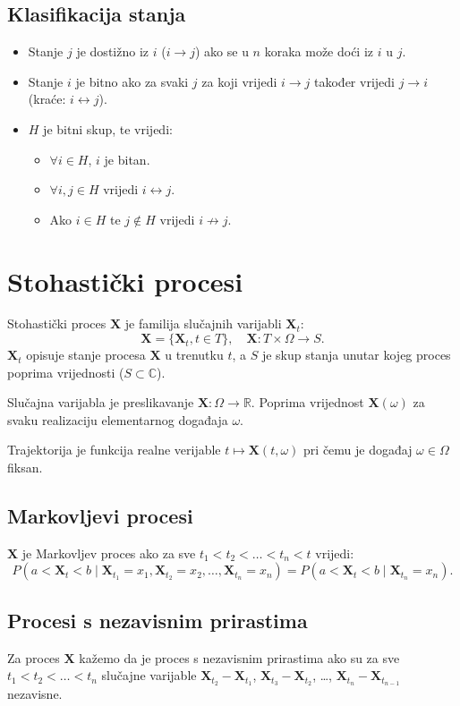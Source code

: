 \documentclass[12pt,english]{article}
\begin{document}
\subsection{Klasifikacija stanja}
\begin{itemize}
  \item Stanje $j$ je dostižno iz $i$ ($i \rightarrow j$) ako se u $n$ koraka može doći iz $i$ u $j$.
  \item Stanje $i$ je bitno ako za svaki $j$ za koji vrijedi $i \rightarrow j$ također vrijedi $j \rightarrow i$ (kraće: $i \leftrightarrow j$).
  \item $H$ je bitni skup, te vrijedi:
  \begin{itemize}
    \item $\forall i \in H$, $i$ je bitan.
    \item $\forall i,j \in H$ vrijedi $i \leftrightarrow j$.
    \item Ako $i \in H$ te $j \not\in H$ vrijedi $i \not\rightarrow j$.
  \end{itemize}
\end{itemize}

\section{Stohastički procesi}
Stohastički proces $\mathbf X$ je familija slučajnih varijabli $\mathbf X_t$:
$$\mathbf X = \{\mathbf X_t, t \in T\},\quad \mathbf X : T \times \Omega \rightarrow S.$$
$\mathbf X_t$ opisuje stanje procesa $\mathbf X$ u trenutku $t$, a $S$ je skup stanja unutar kojeg proces poprima vrijednosti ($S \subset \mathbb C$).

Slučajna varijabla je preslikavanje $\mathbf X : \Omega \rightarrow \mathbb R$. Poprima vrijednost $\mathbf X(\omega)$ za svaku realizaciju elementarnog događaja $\omega$.

Trajektorija je funkcija realne verijable $t \mapsto \mathbf X(t,\omega)$ pri čemu je događaj $\omega \in \Omega$ fiksan.

\subsection{Markovljevi procesi}
$\mathbf X$ je Markovljev proces ako za sve $t_1 < t_2 < \ldots < t_n < t$ vrijedi:
$$P(a<\mathbf X_t < b \;\vert\; \mathbf X_{t_1} = x_1, \mathbf X_{t_2} = x_2, \ldots, \mathbf X_{t_n} = x_n) = P(a < \mathbf X_t < b \;\vert\; \mathbf X_{t_n} = x_n).$$

\subsection{Procesi s nezavisnim prirastima}
Za proces $\mathbf X$ kažemo da je proces s nezavisnim prirastima ako su za sve $t_1 < t_2 < \ldots < t_n$ slučajne varijable $\mathbf X_{t_2} - \mathbf X_{t_1}$, $\mathbf X_{t_3} - \mathbf X_{t_2}$, \ldots, $\mathbf X_{t_n} - \mathbf X_{t_{n-1}}$ nezavisne.
\end{document}
